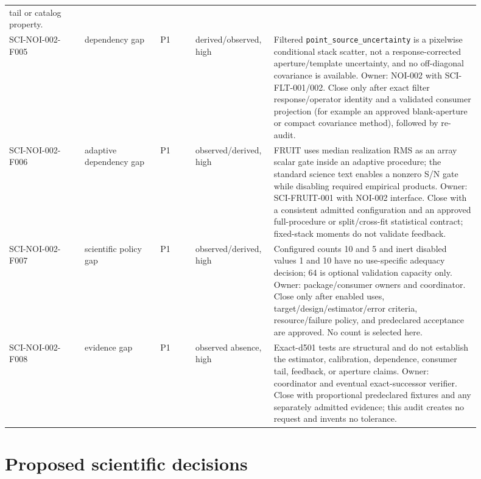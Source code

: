 \documentclass[11pt]{article}
\newcommand{\code}[1]{\nolinkurl{#1}}
\begin{document}
\begin{longtable}{L{0.15\linewidth}L{0.15\linewidth}L{0.07\linewidth}L{0.12\linewidth}L{0.41\linewidth}}
tail or catalog property.\\
SCI-NOI-002-F005 & dependency gap & P1 & derived/observed, high &
Filtered \code{point_source_uncertainty} is a pixelwise conditional stack
scatter, not a response-corrected aperture/template uncertainty, and no
off-diagonal covariance is available.  Owner: NOI-002 with SCI-FLT-001/002.
Close only after exact filter response/operator identity and a validated
consumer projection (for example an approved blank-aperture or compact
covariance method), followed by re-audit.\\
SCI-NOI-002-F006 & adaptive dependency gap & P1 & observed/derived, high &
FRUIT uses median realization RMS as an array scalar gate inside an adaptive
procedure; the standard science text enables a nonzero S/N gate while
disabling required empirical products.  Owner: SCI-FRUIT-001 with NOI-002
interface.  Close with a consistent admitted configuration and an approved
full-procedure or split/cross-fit statistical contract; fixed-stack moments do
not validate feedback.\\
SCI-NOI-002-F007 & scientific policy gap & P1 & observed/derived, high &
Configured counts 10 and 5 and inert disabled values 1 and 10 have no
use-specific adequacy decision; 64 is optional validation capacity only.
Owner: package/consumer owners and coordinator.  Close only after enabled uses,
target/design/estimator/error criteria, resource/failure policy, and
predeclared acceptance are approved.  No count is selected here.\\
SCI-NOI-002-F008 & evidence gap & P1 & observed absence, high &
Exact-d501 tests are structural and do not establish the estimator,
calibration, dependence, consumer tail, feedback, or aperture claims.  Owner:
coordinator and eventual exact-successor verifier.  Close with proportional
predeclared fixtures and any separately admitted evidence; this audit creates
no request and invents no tolerance.\\
\bottomrule
\end{longtable}

\section{Proposed scientific decisions}
\end{document}
